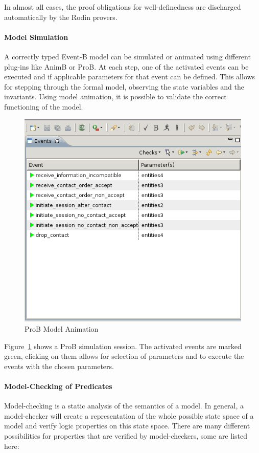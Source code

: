 In almost all cases, the proof obligations for well-definedness are discharged
automatically by the Rodin provers.


\paragraph{Model Simulation}
\label{sec:model-simulation}

A correctly typed Event-B model can be simulated or animated using different
plug-ins like AnimB or ProB. At each step, one of the activated events can be
executed and if applicable parameters for that event can be defined. This allows
for stepping through the formal model, observing the state variables and the
invariants. Using model animation, it is possible to validate the correct
functioning of the model.

\begin{figure}[ht]
  \centering
  \includegraphics[width=.5\textwidth]{figures/ProBAnimation}
  \caption{ProB Model Animation}
  \label{fig:proBAnimation}
\end{figure}

Figure~\ref{fig:proBAnimation} shows a ProB simulation session. The activated
events are marked green, clicking on them allows for selection of parameters and
to execute the events with the chosen parameters.


\paragraph{Model-Checking of Predicates}
\label{sec:model-check-pred}

Model-checking is a static analysis of the semantics of a model. In general, a
model-checker will create a representation of the whole possible state space of
a model and verify logic properties on this state space. There are many
different possibilities for properties that are verified by model-checkers, some
are listed here:

